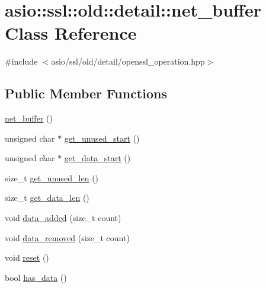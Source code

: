 \hypertarget{classasio_1_1ssl_1_1old_1_1detail_1_1net__buffer}{}\section{asio\+:\+:ssl\+:\+:old\+:\+:detail\+:\+:net\+\_\+buffer Class Reference}
\label{classasio_1_1ssl_1_1old_1_1detail_1_1net__buffer}


{\ttfamily \#include $<$asio/ssl/old/detail/openssl\+\_\+operation.\+hpp$>$}

\subsection*{Public Member Functions}
\begin{DoxyCompactItemize}
\item 
\hyperlink{classasio_1_1ssl_1_1old_1_1detail_1_1net__buffer_a6da947176cc6f4c5d3adc0cb5afcf0c6}{net\+\_\+buffer} ()
\item 
unsigned char $\ast$ \hyperlink{classasio_1_1ssl_1_1old_1_1detail_1_1net__buffer_a7f787b0d5026682f0ac19e2c720f46f9}{get\+\_\+unused\+\_\+start} ()
\item 
unsigned char $\ast$ \hyperlink{classasio_1_1ssl_1_1old_1_1detail_1_1net__buffer_a42007ac573f830dba87b5a5c959764ca}{get\+\_\+data\+\_\+start} ()
\item 
size\+\_\+t \hyperlink{classasio_1_1ssl_1_1old_1_1detail_1_1net__buffer_ac2065ce48fb54ff75a54de072403f713}{get\+\_\+unused\+\_\+len} ()
\item 
size\+\_\+t \hyperlink{classasio_1_1ssl_1_1old_1_1detail_1_1net__buffer_a80b046a5e89d5e22cfdc93db79b48990}{get\+\_\+data\+\_\+len} ()
\item 
void \hyperlink{classasio_1_1ssl_1_1old_1_1detail_1_1net__buffer_aadb568802e90948548f6b8c2d1cce75f}{data\+\_\+added} (size\+\_\+t count)
\item 
void \hyperlink{classasio_1_1ssl_1_1old_1_1detail_1_1net__buffer_ada43bd0574e85e377c9ad4745b2a544d}{data\+\_\+removed} (size\+\_\+t count)
\item 
void \hyperlink{classasio_1_1ssl_1_1old_1_1detail_1_1net__buffer_ad1501336bc3110554e1aea7dd8bc945e}{reset} ()
\item 
bool \hyperlink{classasio_1_1ssl_1_1old_1_1detail_1_1net__buffer_a64d391edf5919bec28cf001bd990c62f}{has\+\_\+data} ()
\end{DoxyCompactItemize}


